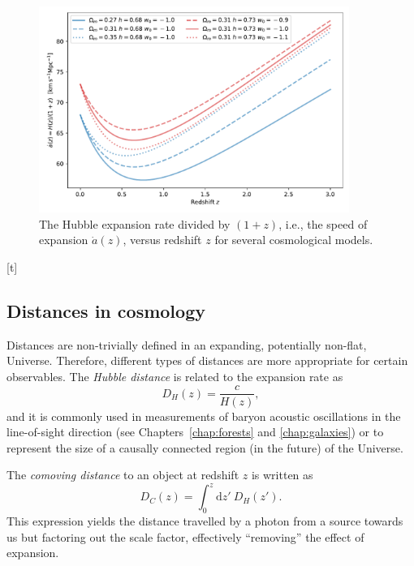     \begin{figure}[t]
        \centering 
        \includegraphics[width=0.9\textwidth]{fig/intro/hubble.pdf}
        \caption{The Hubble expansion rate divided by $(1+z)$, i.e., the speed of expansion $\dot{a}(z)$, 
        versus redshift $z$ for several cosmological models. }
        \label{fig:hubble_theory}
    \end{figure}[t]

    \subsection{Distances in cosmology}
    \label{intro:model:distances}

    Distances are non-trivially defined in an expanding, potentially non-flat, Universe. 
    Therefore, different types of distances are more appropriate for certain observables.
    The \emph{Hubble distance} is related to the expansion rate as 
    \begin{equation}
        D_H(z) = \frac{c}{H(z)},
        \label{eq:hubble_distance}
    \end{equation}
    and it is commonly used in measurements of baryon acoustic oscillations in the line-of-sight 
    direction (see Chapters~\ref{chap:forests} and \ref{chap:galaxies}) or to represent the
    size of a causally connected region (in the future) of the Universe. 
    
    The \emph{comoving distance} to 
    an object at redshift $z$ is written as
    \begin{equation}
        D_C(z)  = \int_0^z \mathrm{d}z' ~ D_H(z').
        \label{eq:comoving_distance}
    \end{equation} 
    This expression yields the distance travelled by a photon from a source towards us but 
    factoring out the scale factor, effectively ``removing'' the effect of expansion. 
    
